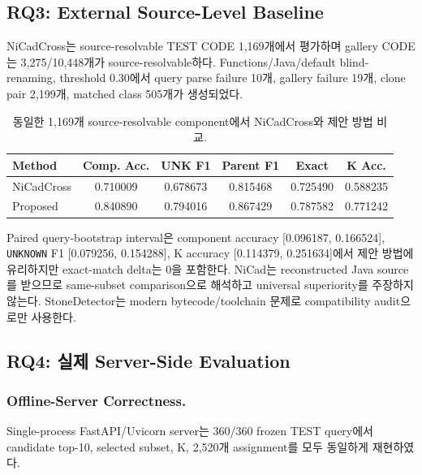 \documentclass[runningheads]{llncs}
\begin{document}
\subsection{RQ3: External Source-Level Baseline}
NiCadCross는 source-resolvable TEST CODE 1,169개에서 평가하며 gallery CODE는 3,275/10,448개가 source-resolvable하다. Functions/Java/default blind-renaming, threshold 0.30에서 query parse failure 10개, gallery failure 19개, clone pair 2,199개, matched class 505개가 생성되었다.
\begin{table}[!htbp]
\centering
\caption{동일한 1,169개 source-resolvable component에서 NiCadCross와 제안 방법 비교.}
\label{tab:nicad}
\scriptsize
\begin{tabular}{lccccc}
\toprule
Method & Comp. Acc. & UNK F1 & Parent F1 & Exact & K Acc.\\
\midrule
NiCadCross & 0.710009 & 0.678673 & 0.815468 & 0.725490 & 0.588235\\
Proposed & 0.840890 & 0.794016 & 0.867429 & 0.787582 & 0.771242\\
\bottomrule
\end{tabular}
\end{table}
Paired query-bootstrap interval은 component accuracy [0.096187, 0.166524], \texttt{UNKNOWN} F1 [0.079256, 0.154288], K accuracy [0.114379, 0.251634]에서 제안 방법에 유리하지만 exact-match delta는 0을 포함한다. NiCad는 reconstructed Java source를 받으므로 same-subset comparison으로 해석하고 universal superiority를 주장하지 않는다. StoneDetector는 modern bytecode/toolchain 문제로 compatibility audit으로만 사용한다.

\subsection{RQ4: 실제 Server-Side Evaluation}
\subsubsection{Offline-Server Correctness.}
Single-process FastAPI/Uvicorn server는 360/360 frozen TEST query에서 candidate top-10, selected subset, K, 2,520개 assignment를 모두 동일하게 재현하였다.
\end{document}
